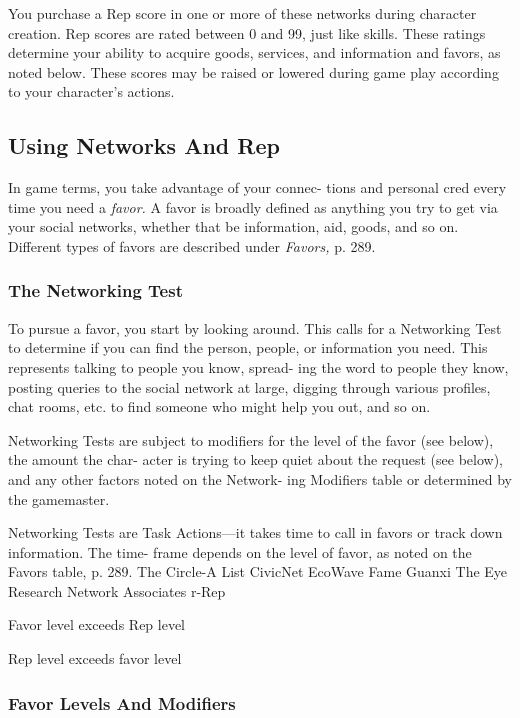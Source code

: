 You purchase a Rep score in one or more of these 
networks during character creation. Rep scores are 
rated between 0 and 99, just like skills. These ratings 
determine your ability to acquire goods, services, and 
information and favors, as noted below. These scores 
may be raised or lowered during game play according 
to your character's actions.

\subsection{Using Networks And Rep}

In game terms, you take advantage of your connec-
tions and personal cred every time you need a \textit{favor.}
A favor is broadly defined as anything you try to get 
via your social networks, whether that be information, 
aid, goods, and so on. Different types of favors are 
described under \textit{Favors,} p. 289.

\subsubsection{The Networking Test}

To pursue a favor, you start by looking around. This 
calls for a Networking Test to determine if you can 
find the person, people, or information you need. 
This represents talking to people you know, spread-
ing the word to people they know, posting queries to 
the social network at large, digging through various 
profiles, chat rooms, etc. to find someone who might 
help you out, and so on.

Networking Tests are subject to modifiers for the 
level of the favor (see below), the amount the char-
acter is trying to keep quiet about the request (see 
below), and any other factors noted on the Network-
ing Modifiers table or determined by the gamemaster.

Networking Tests are Task Actions—it takes time 
to call in favors or track down information. The time-
frame depends on the level of favor, as noted on the 
Favors table, p. 289.
The Circle-A List
CivicNet
EcoWave
Fame
Guanxi
The Eye
Research Network Associates r-Rep

Favor level exceeds Rep level

Rep level exceeds favor level

\subsubsection{Favor Levels And Modifiers}

